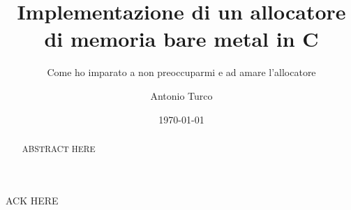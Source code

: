 \documentclass[noexaminfo,oneside,binding=0.6cm]{sapthesis}
\title{Implementazione di un allocatore di memoria bare metal in C}
\subtitle{Come ho imparato a non preoccuparmi e ad amare l'allocatore}
\author{Antonio Turco}
\date{\today}
\begin{document}
\frontmatter  
\maketitle
\dedication{Dedicato a...}

\begin{abstract}
  ABSTRACT HERE
\end{abstract}


\mainmatter 
\tableofcontents













\backmatter

\begin{acknowledgments}
  ACK HERE 
\end{acknowledgments}
\end{document}
